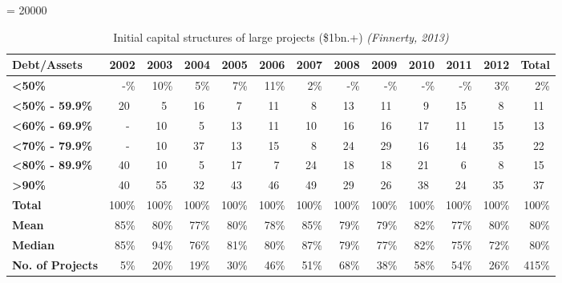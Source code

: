 

\floatingpenalty = 20000




\begin{table*}[] \centering
\begin{small}
\begin{tabular}{@{}lrrrrrrrrrrrr@{}}\toprule
\textbf{Debt/Assets} & \textbf{2002} & \textbf{2003} & \textbf{2004} & \textbf{2005} & \textbf{2006} & \textbf{2007} & \textbf{2008} & \textbf{2009} & \textbf{2010} & \textbf{2011} & \textbf{2012} & \textbf{Total} \\ \midrule
\textbf{<50\%} & -\% & 10\% & 5\% & 7\% & 11\% & 2\% & -\% & -\% & -\% & -\% & 3\% & 2\%\\ \hdashline
\textbf{<50\% - 59.9\%} & 20\ & 5\ & 16\ & 7\ & 11\ & 8\ & 13\ & 11\ & 9\ & 15\ & 8\ & 11\ \\ \hdashline
\textbf{<60\% - 69.9\%} &  -\ & 10\ & 5\ & 13\ & 11\ & 10\ & 16\ & 16\ & 17\ & 11\ & 15\ & 13\ \\ \hdashline
\textbf{<70\% - 79.9\%} &  -\ & 10\ & 37\ & 13\ & 15\ & 8\ & 24\ & 29\ & 16\ & 14\ & 35\ & 22\ \\ \hdashline
\textbf{<80\% - 89.9\%} &  40\ & 10\ & 5\ & 17\ & 7\ & 24\ & 18\ & 18\ & 21\ & 6\ & 8\ & 15\ \\ \hdashline
\textbf{>90\%} &  40\ & 55\ & 32\ & 43\ & 46\ & 49\ & 29\ & 26\ & 38\ & 24\ & 35\ & 37\ \\ \midrule
\textbf{Total} &  100\% & 100\% & 100\% & 100\% & 100\% & 100\% & 100\% & 100\% & 100\% & 100\% & 100\% & 100\% \\ \midrule
\textbf{Mean} &  85\% & 80\% & 77\% & 80\% & 78\% & 85\% & 79\% & 79\% & 82\% & 77\% & 80\% & 80\% \\ \hdashline
\textbf{Median} &  85\% & 94\% & 76\% & 81\% & 80\% & 87\% & 79\% & 77\% & 82\% & 75\% & 72\% & 80\% \\ \hdashline
\textbf{No. of Projects} &  5\% & 20\% & 19\% & 30\% & 46\% & 51\% & 68\% & 38\% & 58\% & 54\% & 26\% & 415\% \\
\bottomrule
\end{tabular}
\end{small}
\caption{Initial capital structures of large projects (\$1bn.+) \emph{(Finnerty, 2013)}}
\end{table*}

